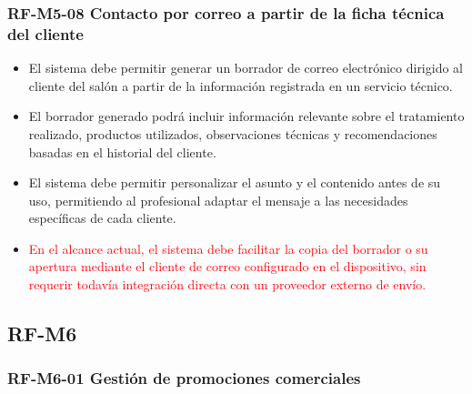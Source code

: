 \vspace{-0.75em}
\subsubsection{RF-M5-08 Contacto por correo a partir de la ficha técnica del cliente}
\vspace{-1em}

\begin{itemize}
    \item El sistema debe permitir generar un borrador de correo electrónico dirigido al cliente del salón a partir de la información registrada en un servicio técnico.
    \item El borrador generado podrá incluir información relevante sobre el tratamiento realizado, productos utilizados, observaciones técnicas y recomendaciones basadas en el historial del cliente.
    \item El sistema debe permitir personalizar el asunto y el contenido antes de su uso, permitiendo al profesional adaptar el mensaje a las necesidades específicas de cada cliente.
    \item \textcolor{red}{En el alcance actual, el sistema debe facilitar la copia del borrador o su apertura mediante el cliente de correo configurado en el dispositivo, sin requerir todavía integración directa con un proveedor externo de envío.}
\end{itemize}

\subsection{RF-M6}

\vspace{-0.75em}
\subsubsection{RF-M6-01 Gestión de promociones comerciales}
\vspace{-1em}

